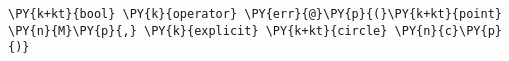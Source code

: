 \begin{Verbatim}[commandchars=\\\{\}]
    \PY{k+kt}{bool} \PY{k}{operator} \PY{err}{@}\PY{p}{(}\PY{k+kt}{point} \PY{n}{M}\PY{p}{,} \PY{k}{explicit} \PY{k+kt}{circle} \PY{n}{c}\PY{p}{)}
\end{Verbatim}
